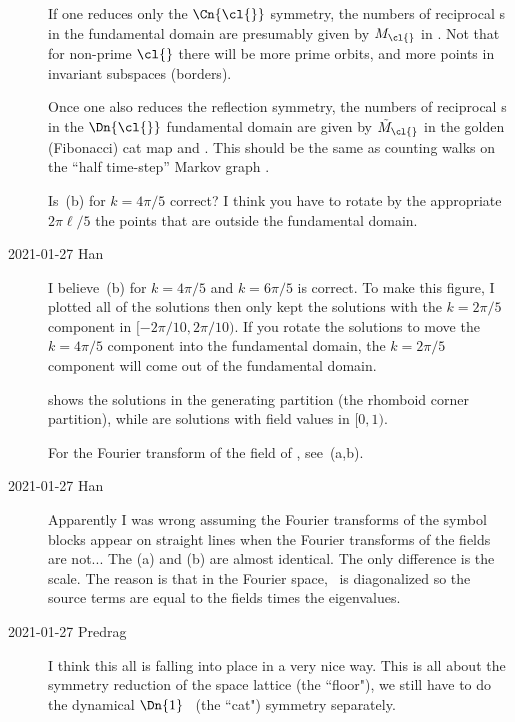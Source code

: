 \begin{description}
If one reduces only the $\Cn{\cl{}}$ symmetry, the numbers of reciprocal
{\lattstate}s in the fundamental domain are presumably given by $M_\cl{}$
in . Not that for non-prime $\cl{}$ there will
be more prime orbits, and more points in invariant subspaces (borders).

Once one also reduces the reflection symmetry, the numbers of reciprocal
{\lattstate}s in the $\Dn{\cl{}}$ fundamental domain are
given by $\tilde{M}_\cl{}$ in the golden (Fibonacci) cat map
 and .
This should be the same as counting walks on
the ``half time-step'' Markov graph .

Is \,(b) for $k=4\pi/5$ correct?
I think you have to rotate by the appropriate $2\pi\ell/5$ the points that
are outside the fundamental domain.


    \item[2021-01-27 Han]
I believe \,(b) for $k=4\pi/5$ and
$k=6\pi/5$ is correct. To make this figure, I plotted all of the solutions then
only kept the solutions with the $k=2\pi/5$ component in $[-2\pi/10,2\pi/10)$.
If you rotate the solutions to move the $k=4\pi/5$ component into the
fundamental domain, the $k=2\pi/5$ component will come out of the
fundamental domain.

 shows the solutions in the generating
partition (the rhomboid corner partition),
while  are solutions with field values in
$[0,1)$.

 For the Fourier transform of the
field of , see
\,(a,b).

    \item[2021-01-27 Han]
Apparently I was wrong assuming the Fourier transforms of the symbol
blocks appear on straight lines when the Fourier transforms of the fields
are not... The  (a) and (b) are
almost identical. The only difference is the scale. The reason is that in
the Fourier space, \jacobianOrb\ is diagonalized so the source terms are
equal to the fields times the eigenvalues.

    \item[2021-01-27 Predrag]
I think this all is falling into place in a very nice way. This is all
about the symmetry reduction of the space lattice (the ``floor"), we
still have to do the dynamical $\Dn{1}$ \templatt\ (the ``cat") symmetry
separately.


\end{description}
